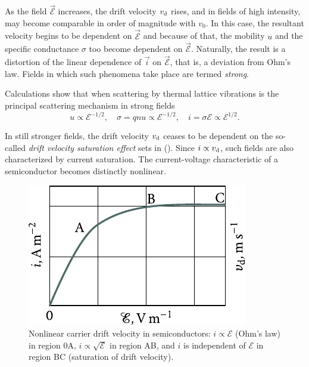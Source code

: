 As the field $\vec{\mathcal{E}}$ increases, the drift velocity $v_{\text{d}}$ rises, and in fields of high intensity, may become comparable in order of magnitude with $v_0$. In this case, the resultant velocity begins to be dependent on $\vec{\mathcal{E}}$ and because of that, the mobility $u$ and the specific conductance $\sigma$ too become dependent on $\vec{\mathcal{E}}$. Naturally, the result is a distortion of the linear
dependence of $\vec{i}$ on $\vec{\mathcal{E}}$, that is, a deviation from Ohm's law. Fields in which such phenomena take place are termed \textit{strong}.

Calculations show that when scattering by thermal lattice vibrations is the principal scattering mechanism in strong fields
\begin{equation}\label{eq:6_41}
	u \propto \mathcal{E}^{-1/2},\quad \sigma = qnu \propto\mathcal{E}^{-1/2},\quad i = \sigma\mathcal{E} \propto \mathcal{E}^{1/2}.
\end{equation}

In still stronger fields, the drift velocity $v_{\text{d}}$ ceases to be dependent on the so-called \textit{drift velocity saturation effect} sets in (). Since $i\propto v_{\text{d}}$, such fields are also characterized by current saturation. The current-voltage characteristic of a semiconductor becomes distinctly nonlinear.

\begin{figure}[t]
	\begin{center}
		\includegraphics[scale=1]{figures/ch_06/fig_6_15.pdf}
		\caption[]{Nonlinear carrier drift velocity in semiconductors: $i\propto\mathcal{E}$ (Ohm's law) in region $0$A, $i\propto\sqrt{\mathcal{E}}$ in region AB, and $i$ is independent of $\mathcal{E}$ in region BC (saturation of drift velocity).}
		\label{fig:6_15}
	\end{center}
	\vspace{-0.7cm}
\end{figure}

